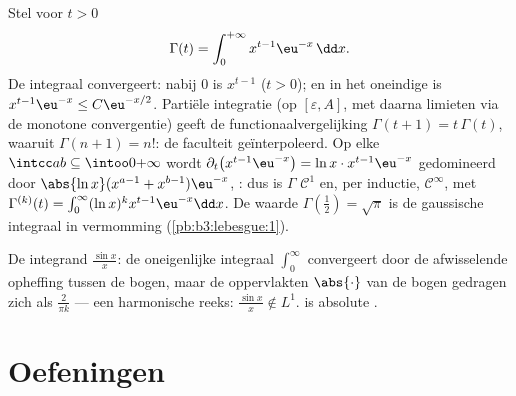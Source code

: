 \begin{example}[De gammafunctie]\label{ex:b3:lebesgue:gamma}
Stel voor $t > 0$
\[
\Gamma(t) = \int_0^{+\infty} x^{t-1}\eu^{-x}\,\dd x .
\]
De integraal convergeert: nabij $0$ is $x^{t-1}$ 
($t > 0$); en in het oneindige is $x^{t-1}\eu^{-x} \leq
C\eu^{-x/2}$. Partiële integratie (op $[\varepsilon, A]$, met
daarna limieten via de monotone convergentie) geeft de
functionaalvergelijking $\Gamma(t + 1) = t\,\Gamma(t)$, waaruit
$\Gamma(n+1) = n!$: de faculteit geïnterpoleerd. Op elke $\intcc
ab \subseteq \intoo0{+\infty}$ wordt
$\partial_t\bigl(x^{t-1}\eu^{-x}\bigr) = \ln x\cdot
x^{t-1}\eu^{-x}$ gedomineerd door $\abs{\ln x}(x^{a-1} +
x^{b-1})\eu^{-x}$, : dus is $\Gamma$ $\mathcal C^1$
en, per inductie, $\mathcal C^\infty$, met $\Gamma^{(k)}(t) =
\int_0^\infty(\ln x)^kx^{t-1}\eu^{-x}\dd x$. De waarde
$\Gamma(\frac12) = \sqrt\pi$ is de gaussische integraal in
vermomming (\cref{pb:b3:lebesgue:1}).
\end{example}

\begin{omfigure}

{\small De integrand $\frac{\sin x}x$: de oneigenlijke integraal
$\int_0^\infty$ convergeert door de afwisselende opheffing tussen
de bogen, maar de oppervlakten $\abs{\cdot}$ van de bogen gedragen
zich als $\frac2{\pi k}$ --- een harmonische reeks: $\frac{\sin
x}x \notin L^1$.  is absolute
.}
\end{omfigure}

\section{Oefeningen}

